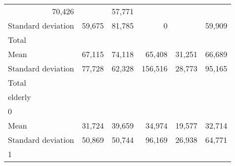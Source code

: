 \begin{tabular}{llllll}
  \multicolumn{1}{r}{70,426} &
  \multicolumn{1}{r}{} &
  \multicolumn{1}{r}{57,771} \\
\multicolumn{1}{l}{\hspace{4em}Standard deviation} &
  \multicolumn{1}{|r}{59,675} &
  \multicolumn{1}{r}{81,785} &
  \multicolumn{1}{r}{0} &
  \multicolumn{1}{r}{} &
  \multicolumn{1}{r}{59,909} \\
\multicolumn{1}{l}{\hspace{3em}Total} &
  \multicolumn{1}{|r}{} &
  \multicolumn{1}{r}{} &
  \multicolumn{1}{r}{} &
  \multicolumn{1}{r}{} &
  \multicolumn{1}{r}{} \\
\multicolumn{1}{l}{\hspace{4em}Mean} &
  \multicolumn{1}{|r}{67,115} &
  \multicolumn{1}{r}{74,118} &
  \multicolumn{1}{r}{65,408} &
  \multicolumn{1}{r}{31,251} &
  \multicolumn{1}{r}{66,689} \\
\multicolumn{1}{l}{\hspace{4em}Standard deviation} &
  \multicolumn{1}{|r}{77,728} &
  \multicolumn{1}{r}{62,328} &
  \multicolumn{1}{r}{156,516} &
  \multicolumn{1}{r}{28,773} &
  \multicolumn{1}{r}{95,165} \\
\multicolumn{1}{l}{\hspace{1em}Total} &
  \multicolumn{1}{|r}{} &
  \multicolumn{1}{r}{} &
  \multicolumn{1}{r}{} &
  \multicolumn{1}{r}{} &
  \multicolumn{1}{r}{} \\
\multicolumn{1}{l}{\hspace{2em}elderly} &
  \multicolumn{1}{|r}{} &
  \multicolumn{1}{r}{} &
  \multicolumn{1}{r}{} &
  \multicolumn{1}{r}{} &
  \multicolumn{1}{r}{} \\
\multicolumn{1}{l}{\hspace{3em}0} &
  \multicolumn{1}{|r}{} &
  \multicolumn{1}{r}{} &
  \multicolumn{1}{r}{} &
  \multicolumn{1}{r}{} &
  \multicolumn{1}{r}{} \\
\multicolumn{1}{l}{\hspace{4em}Mean} &
  \multicolumn{1}{|r}{31,724} &
  \multicolumn{1}{r}{39,659} &
  \multicolumn{1}{r}{34,974} &
  \multicolumn{1}{r}{19,577} &
  \multicolumn{1}{r}{32,714} \\
\multicolumn{1}{l}{\hspace{4em}Standard deviation} &
  \multicolumn{1}{|r}{50,869} &
  \multicolumn{1}{r}{50,744} &
  \multicolumn{1}{r}{96,169} &
  \multicolumn{1}{r}{26,938} &
  \multicolumn{1}{r}{64,771} \\
\multicolumn{1}{l}{\hspace{3em}1} &

\end{tabular}
